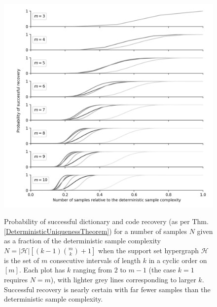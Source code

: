 \begin{figure}\label{probpigeon}
\begin{center}
\includegraphics[width=1 \linewidth]{figures/prob_vs_samples.png}
\caption{Probability of successful dictionary and code recovery (as per Thm. \ref{DeterministicUniquenessTheorem}) for a number of samples $N$ given as a fraction of the deterministic sample complexity $N = |\mathcal{H}|[(k-1){m \choose k} + 1]$ when the support set hypergraph $\mathcal{H}$ is the set of $m$ consecutive intervals of length $k$ in a cyclic order on $[m]$. Each plot has $k$ ranging from $2$ to $m-1$ (the case $k=1$ requires $N=m$), with lighter grey lines corresponding to larger $k$. Successful recovery is nearly certain with far fewer samples than the deterministic sample complexity. }
\vspace{-.6 cm}
\label{probvsamples}
\end{center}
\end{figure}

